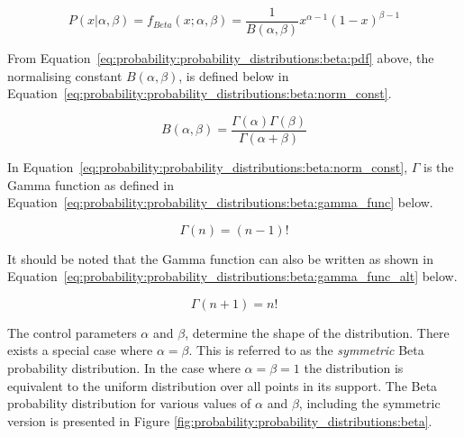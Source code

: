 \begin{equation}
      \label{eq:probability:probability_distributions:beta:pdf}
      P(x \vert \alpha, \beta) = f_{Beta}(x; \alpha, \beta) = \frac{1}{B(\alpha, \beta)} x^{\alpha - 1} (1 - x)^{\beta - 1}
\end{equation}

From Equation~\eqref{eq:probability:probability_distributions:beta:pdf} above, the normalising constant $B(\alpha, \beta)$, is defined below in Equation~\eqref{eq:probability:probability_distributions:beta:norm_const}.

\begin{equation}
      \label{eq:probability:probability_distributions:beta:norm_const}
      B(\alpha, \beta) = \frac{\Gamma(\alpha)\Gamma(\beta)}{\Gamma(\alpha + \beta)}
\end{equation}

In Equation~\eqref{eq:probability:probability_distributions:beta:norm_const}, $\Gamma$ is the Gamma function as defined in Equation~\eqref{eq:probability:probability_distributions:beta:gamma_func} below.

\begin{equation}
      \label{eq:probability:probability_distributions:beta:gamma_func}
      \Gamma(n) = ( n - 1)!
\end{equation}

It should be noted that the Gamma function can also be written as shown in Equation~\eqref{eq:probability:probability_distributions:beta:gamma_func_alt} below.

\begin{equation}
      \label{eq:probability:probability_distributions:beta:gamma_func_alt}
      \Gamma(n+1) = n!
\end{equation}

The control parameters $\alpha$ and $\beta$, determine the shape of the distribution. There exists a special case where $\alpha = \beta$. This is referred to as the \textit{symmetric} Beta probability distribution. In the case where $\alpha = \beta = 1$ the distribution is equivalent to the uniform distribution over all points in its support. The Beta probability distribution for various values of $\alpha$ and $\beta$, including the symmetric version is presented in Figure \ref{fig:probability:probability_distributions:beta}.

